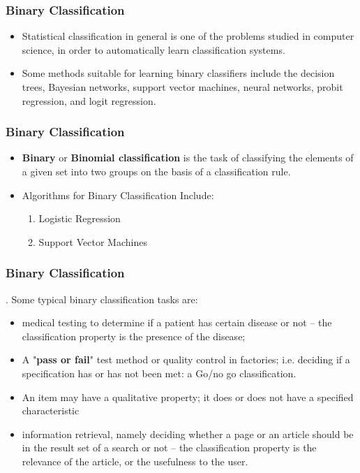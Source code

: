 \documentclass[a4]{beamer}
\begin{document}
\begin{frame}
	\frametitle{Binary Classification}
	\large
	\begin{itemize}
		\item 
	Statistical classification in general is one of the problems studied in computer science, in order to automatically learn classification systems.
	\item Some methods suitable for learning binary classifiers include the decision trees, Bayesian networks, support vector machines, neural networks, probit regression, and logit regression.
	\end{itemize}
\end{frame}
\begin{frame}
	\frametitle{Binary Classification}
	\large
\begin{itemize}
\item 	\textbf{Binary} or \textbf{Binomial classification} is the task of classifying the elements of a given set into two groups on the basis of a classification rule.
\item Algorithms for Binary Classification Include:
\begin{enumerate}
	\item Logistic Regression
	\item Support Vector Machines
\end{enumerate}
\end{itemize}
\end{frame}
\begin{frame}
	\frametitle{Binary Classification}
	\large
. Some typical binary classification tasks are:
\begin{itemize}
\item	medical testing to determine if a patient has certain disease or not – the classification property is the presence of the disease;
\item	A "\textbf{pass or fail}" test method or quality control in factories; i.e. deciding if a specification has or has not been met: a Go/no go classification.
\item 	An item may have a qualitative property; it does or does not have a specified characteristic
\item	information retrieval, namely deciding whether a page or an article should be in the result set of a search or not – the classification property is the relevance of the article, or the usefulness to the user.
\end{itemize}	


\end{frame}
\end{document}
